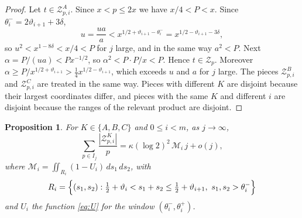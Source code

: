 \documentclass[aps,prd,twocolumn,superscriptaddress,nofootinbib,longbibliography,floatfix,showkeys,nobalancelastpage,amsmath,amssymb,10pt]{revtex4-2}
\theoremstyle{plain}
\newtheorem{proposition}[theorem]{Proposition}
\theoremstyle{definition}
\theoremstyle{plain}
\newcommand{\Zc}{\mathcal{Z}}
\newcommand{\Mc}{\mathcal{M}}
\begin{document}
\begin{proof}
Let $t\in\Zc^A_{p,i}$. Since $x<p\le2x$ we have $x/4<P<x$. Since $\theta_i^-=2\vartheta_{i+1}+3\delta$,
\[
u=\frac{ua}a<x^{1/2+\vartheta_{i+1}-\theta_i^-}=x^{1/2-\vartheta_{i+1}-3\delta},
\]
so $u^2<x^{1-8\delta}<x/4<P$ for $j$ large, and in the same way $a^2<P$. Next $\alpha=P/(ua)<Px^{-1/2}$, so $\alpha^2<P\cdot P/x<P$. Hence $t\in\Zc_p$. Moreover $\alpha\ge P/x^{1/2+\vartheta_{i+1}}>\frac14x^{1/2-\vartheta_{i+1}}$, which exceeds $u$ and $a$ for $j$ large. The pieces $\Zc^B_{p,i}$ and $\Zc^C_{p,i}$ are treated in the same way. Pieces with different $K$ are disjoint because their largest coordinates differ, and pieces with the same $K$ and different $i$ are disjoint because the ranges of the relevant product are disjoint.
\end{proof}

\begin{proposition}\label{prop:strips}
For $K\in\{A,B,C\}$ and $0\le i<m$, as $j\to\infty$,
\[
\sum_{p\in I_j}\frac{|\Zc^K_{p,i}|}p=\kappa(\log2)^2\,\Mc_i\,j+o(j),
\]
where $\Mc_i=\iint_{R_i}(1-U_i)\,ds_1\,ds_2$, with
\[
R_i=\Bigl\{(s_1,s_2):\tfrac12+\vartheta_i<s_1+s_2\le\tfrac12+\vartheta_{i+1},\ s_1,s_2>\theta_i^-\Bigr\}
\]
and $U_i$ the function \eqref{eq:U} for the window $(\theta_i^-,\theta_i^+)$.
\end{proposition}
\end{document}
